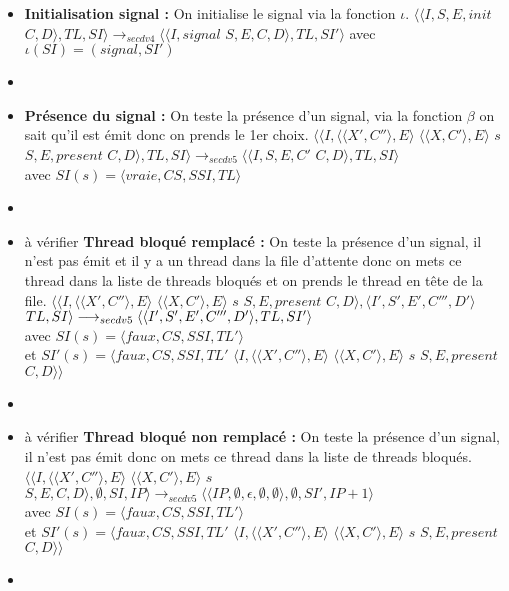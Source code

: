 \documentclass[10pt,a4paper]{article}
\begin{document}
\begin{enumerate}
\begin{itemize}
				\item[] \textbf{Initialisation signal :} On initialise le signal via la fonction $\iota$.
				\smallbreak 
				$\langle\langle I,S,E,init$ $C,D\rangle,TL,SI\rangle 
				\longrightarrow_{secdv4}
				\langle\langle I,signal$ $S,E,C,D\rangle,TL,SI'\rangle$
				avec $\iota(SI) = (signal,SI')$
				\item[]	
				
				\item[] \textbf{Présence du signal :} On teste la présence d'un signal, via la fonction $\beta$ on sait qu'il est émit donc on prends le 1er choix.
				\smallbreak
				$\langle\langle I,\langle\langle X',C''\rangle,E\rangle$ $\langle\langle X,C'\rangle,E\rangle$ $s$ $S,E,present$ $C,D\rangle,TL,SI\rangle 
				\longrightarrow_{secdv5} 
				\langle\langle I,S,E,C'$ $C,D\rangle,TL,SI\rangle$ 
				\\avec $SI(s) = \langle vraie,CS,SSI,TL\rangle$
				\item[]
				
				
				\item[] à vérifier\textbf{ Thread bloqué remplacé :} On teste la présence d'un signal, il n'est pas émit et il y a un thread dans la file d'attente
				donc on mets ce thread dans la liste de threads bloqués et on prends le thread en tête de la file.
				\smallbreak
				$\langle\langle I,\langle\langle X',C''\rangle,E\rangle$ $\langle\langle X,C'\rangle,E\rangle$ $s$ $S,E,present$ $C,D\rangle,\langle I',S',E',C''',D'\rangle$ $TL,SI\rangle 
				\\\longrightarrow_{secdv5} 
				\langle\langle I',S',E',C''',D'\rangle,TL,SI'\rangle$ 
				\\avec $SI(s) = \langle faux,CS,SSI,TL'\rangle$
				\\et $SI'(s) = \langle faux,CS,SSI,TL'$ $\langle I,\langle\langle X',C''\rangle,E\rangle$ $\langle\langle X,C'\rangle,E\rangle$ $s$ $S,E,present$ $C,D\rangle\rangle$
				\item[]	
				
				\item[] à vérifier \textbf{Thread bloqué non remplacé :} On teste la présence d'un signal, il n'est pas émit donc on mets ce thread dans la liste de threads bloqués.
				\smallbreak 
				$\langle\langle I,\langle\langle X',C''\rangle,E\rangle$ $\langle\langle X,C'\rangle,E\rangle$ $s$ $S,E,C,D\rangle,\emptyset,SI,IP\rangle 
				\longrightarrow_{secdv5} 
				\langle\langle IP,\emptyset,\epsilon,\emptyset,\emptyset\rangle,\emptyset,SI',IP+1\rangle$
				\\avec $SI(s) = \langle faux,CS,SSI,TL'\rangle$
				\\et $SI'(s) = \langle faux,CS,SSI,TL'$ $\langle I,\langle\langle X',C''\rangle,E\rangle$ $\langle\langle X,C'\rangle,E\rangle$ $s$ $S,E,present$ $C,D\rangle\rangle$
				\item[]
				

\end{itemize}
\end{enumerate}
\end{document}
